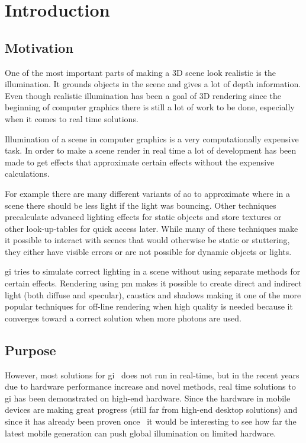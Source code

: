 \chapter{Introduction}\label{cha:intro}

\section{Motivation}

One of the most important parts of making a 3D scene look realistic is the illumination. It grounds objects in the scene and gives a lot of depth information. Even though realistic illumination has been a goal of 3D rendering since the beginning of computer graphics there is still a lot of work to be done, especially when it comes to real time solutions.

Illumination of a scene in computer graphics is a very computationally expensive task. In order to make a scene render in real time a lot of development has been made to get effects that approximate certain effects without the expensive calculations.

For example there are many different variants of \gls{ao} to approximate where in a scene there should be less light if the light was bouncing. Other techniques precalculate advanced lighting effects for static objects and store textures or other look-up-tables for quick access later. While many of these techniques make it possible to interact with scenes that would otherwise be static or stuttering, they either have visible errors or are not possible for dynamic objects or lights.

\gls{gi} tries to simulate correct lighting in a scene without using separate methods for certain effects. Rendering using \gls{pm} makes it possible to create direct and indirect light (both diffuse and specular), caustics and shadows making it one of the more popular techniques for off-line rendering when high quality is needed because it converges toward a correct solution when more photons are used.



\section{Purpose}

However, most solutions for \gls{gi}~\cite{sotagi} does not run in real-time, but in the recent years due to hardware performance increase and novel methods, real time solutions to \gls{gi} has been demonstrated on high-end hardware. Since the hardware in mobile devices are making great progress (still far from high-end desktop solutions) and since it has already been proven once~\cite{gimobile} it would be interesting to see how far the latest mobile generation can push global illumination on limited hardware.

